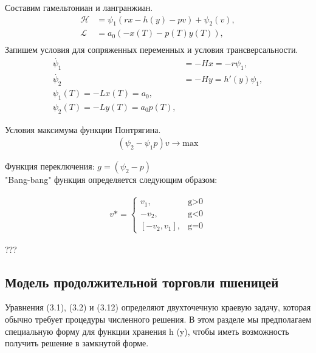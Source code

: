 Составим гамельтониан и лангранжиан. 
\begin{align}
    \mathcal{H} & = \psi_{1} (r x - h(y) - p v) + \psi_{2} (v),\\
    \mathcal{L} & = a_{0} (-x(T) - p(T) y(T)),\\
\end{align} 
Запишем условия для сопряженных переменных и условия трансверсальности.
\begin{align}
    \Dot{\psi_{1}} & = -H x = -r \psi_{1},\\
    \Dot{\psi_{2}} & = -H y = h'(y) \psi_{1},\\
    {\psi_{1}(T)} = - {L}x(T)=a_{0},\\
    {\psi_{2}(T)} = - {L}y(T)=a_{0} p(T),
\end{align} 

Условия максимума функции Понтрягина.
\begin{align}
    (\psi_{2} - \psi_{1} p)v\to \mathrm{max}
\end{align} 

Функция переключения:
$g = (\psi_{2} - p)$\\

"Bang-bang" функция определяется следующим образом:

\begin{align}
v* = 
 \begin{cases}
   v_{1}, &\text{g>0}\\
   -v_{2}, &\text{g<0}\\
   [-v_{2},v_{1}], &\text{g=0}
 \end{cases}
\end{align}


???

\subsection{Модель продолжительной торговли пшеницей}
Уравнения (3.1), (3.2) и (3.12) определяют двухточечную краевую задачу, которая обычно требует процедуры численного решения. В этом разделе мы предполагаем специальную форму для функции хранения h (y), чтобы иметь возможность получить решение в замкнутой форме.

